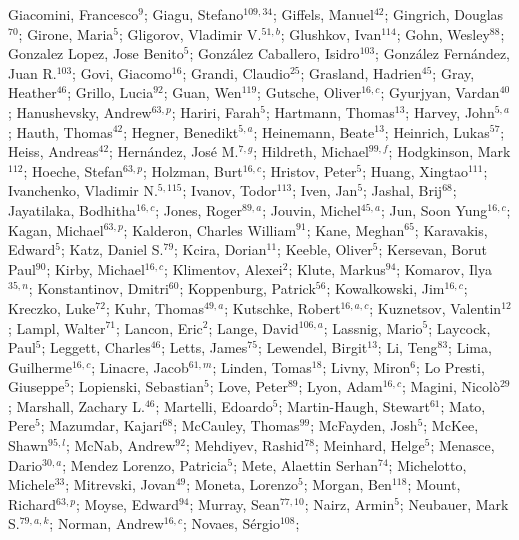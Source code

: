 Giacomini, Francesco$^{9}$;
Giagu, Stefano$^{109,34}$;
Giffels, Manuel$^{42}$;
Gingrich, Douglas$^{70}$;
Girone, Maria$^{5}$;
Gligorov, Vladimir V.$^{51,b}$;
Glushkov, Ivan$^{114}$;
Gohn, Wesley$^{88}$;
Gonzalez Lopez, Jose Benito$^{5}$;
González Caballero, Isidro$^{103}$;
González Fernández, Juan R.$^{103}$;
Govi, Giacomo$^{16}$;
Grandi, Claudio$^{25}$;
Grasland, Hadrien$^{45}$;
Gray, Heather$^{46}$;
Grillo, Lucia$^{92}$;
Guan, Wen$^{119}$;
Gutsche, Oliver$^{16,c}$;
Gyurjyan, Vardan$^{40}$;
Hanushevsky, Andrew$^{63,p}$;
Hariri, Farah$^{5}$;
Hartmann, Thomas$^{13}$;
Harvey, John$^{5,a}$;
Hauth, Thomas$^{42}$;
Hegner, Benedikt$^{5,a}$;
Heinemann, Beate$^{13}$;
Heinrich, Lukas$^{57}$;
Heiss, Andreas$^{42}$;
Hernández, José M.$^{7,g}$;
Hildreth, Michael$^{99,f}$;
Hodgkinson, Mark$^{112}$;
Hoeche, Stefan$^{63,p}$;
Holzman, Burt$^{16,c}$;
Hristov, Peter$^{5}$;
Huang, Xingtao$^{111}$;
Ivanchenko, Vladimir N.$^{5,115}$;
Ivanov, Todor$^{113}$;
Iven, Jan$^{5}$;
Jashal, Brij$^{68}$;
Jayatilaka, Bodhitha$^{16,c}$;
Jones, Roger$^{89,a}$;
Jouvin, Michel$^{45,a}$;
Jun, Soon Yung$^{16,c}$;
Kagan, Michael$^{63,p}$;
Kalderon, Charles William$^{91}$;
Kane, Meghan$^{65}$;
Karavakis, Edward$^{5}$;
Katz, Daniel S.$^{79}$;
Kcira, Dorian$^{11}$;
Keeble, Oliver$^{5}$;
Kersevan, Borut Paul$^{90}$;
Kirby, Michael$^{16,c}$;
Klimentov, Alexei$^{2}$;
Klute, Markus$^{94}$;
Komarov, Ilya$^{35,n}$;
Konstantinov, Dmitri$^{60}$;
Koppenburg, Patrick$^{56}$;
Kowalkowski, Jim$^{16,c}$;
Kreczko, Luke$^{72}$;
Kuhr, Thomas$^{49,a}$;
Kutschke, Robert$^{16,a,c}$;
Kuznetsov, Valentin$^{12}$;
Lampl, Walter$^{71}$;
Lancon, Eric$^{2}$;
Lange, David$^{106,a}$;
Lassnig, Mario$^{5}$;
Laycock, Paul$^{5}$;
Leggett, Charles$^{46}$;
Letts, James$^{75}$;
Lewendel, Birgit$^{13}$;
Li, Teng$^{83}$;
Lima, Guilherme$^{16,c}$;
Linacre, Jacob$^{61,m}$;
Linden, Tomas$^{18}$;
Livny, Miron$^{6}$;
Lo Presti, Giuseppe$^{5}$;
Lopienski, Sebastian$^{5}$;
Love, Peter$^{89}$;
Lyon, Adam$^{16,c}$;
Magini, Nicolò$^{29}$;
Marshall, Zachary L.$^{46}$;
Martelli, Edoardo$^{5}$;
Martin-Haugh, Stewart$^{61}$;
Mato, Pere$^{5}$;
Mazumdar, Kajari$^{68}$;
McCauley, Thomas$^{99}$;
McFayden, Josh$^{5}$;
McKee, Shawn$^{95,l}$;
McNab, Andrew$^{92}$;
Mehdiyev, Rashid$^{78}$;
Meinhard, Helge$^{5}$;
Menasce, Dario$^{30,a}$;
Mendez Lorenzo, Patricia$^{5}$;
Mete, Alaettin Serhan$^{74}$;
Michelotto, Michele$^{33}$;
Mitrevski, Jovan$^{49}$;
Moneta, Lorenzo$^{5}$;
Morgan, Ben$^{118}$;
Mount, Richard$^{63,p}$;
Moyse, Edward$^{94}$;
Murray, Sean$^{77,10}$;
Nairz, Armin$^{5}$;
Neubauer, Mark S.$^{79,a,k}$;
Norman, Andrew$^{16,c}$;
Novaes, Sérgio$^{108}$;
